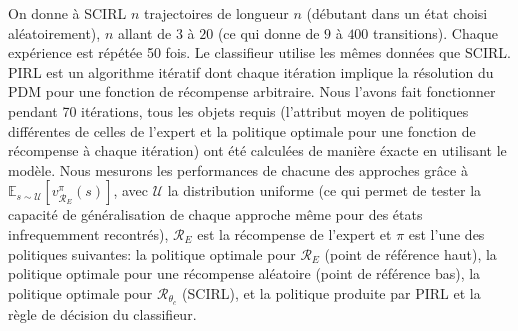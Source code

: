 \documentclass[english,utf8]{./hermes-journal}
\newcommand{\R}{\mathcal{R}}
\newcommand{\E}{\mathbb{E}}
\begin{document}
On donne à SCIRL $n$ trajectoires de longueur $n$ (débutant dans un état choisi aléatoirement), $n$ allant de  $3$ à $20$ (ce qui donne de $9$ à
$400$ transitions). Chaque expérience est répétée 50 fois. Le classifieur utilise les mêmes données que SCIRL. PIRL est un algorithme itératif dont chaque itération implique la résolution du PDM pour une fonction de récompense arbitraire. Nous l'avons fait fonctionner pendant 70 itérations, tous les objets requis (l'attribut moyen de politiques différentes de celles de l'expert et la politique optimale pour une fonction de récompense à chaque itération) ont été calculées de manière éxacte en utilisant le modèle. Nous mesurons les performances de chacune des approches grâce à $\E_{s\sim \mathcal{U}}[v^\pi_{\R_E}(s)]$, avec $\mathcal{U}$
la distribution uniforme (ce qui permet de tester la capacité de généralisation de chaque approche même pour des états infrequemment recontrés), $\R_E$ est la récompense de l'expert et $\pi$ est l'une des politiques suivantes: la politique optimale pour $\R_E$ (point de référence haut),
la politique optimale pour une récompense aléatoire (point de référence bas), la politique optimale pour $\R_{\theta_c}$ (SCIRL), et la politique produite par PIRL et la règle de décision du classifieur.
\end{document}
